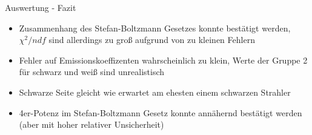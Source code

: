 \documentclass[12pt]{beamer}
\begin{document}
\begin{frame}{Auswertung - Fazit}
\begin{itemize}
	\item Zusammenhang des Stefan-Boltzmann Gesetzes konnte bestätigt werden, $\chi^2/ndf$ sind allerdings zu groß aufgrund von zu kleinen Fehlern
	\item Fehler auf Emissionskoeffizenten wahrscheinlich zu klein, Werte der Gruppe 2 für schwarz und weiß sind unrealistisch
	\item Schwarze Seite gleicht wie erwartet am ehesten einem schwarzen Strahler
	\item 4er-Potenz im Stefan-Boltzmann Gesetz konnte annähernd bestätigt werden (aber mit hoher relativer Unsicherheit)
\end{itemize}
\end{frame}
\end{document}
